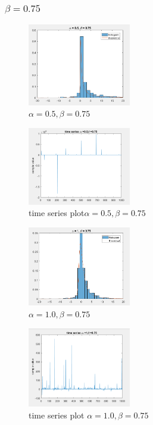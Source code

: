 \documentclass[twoside]{article}
\begin{document}
\begin{multicols*}{2}
\subsubsection{$\beta = 0.75$}
\begin{figure}[H]
   \centering
   \includegraphics[width = 0.4\textwidth]{../data/a05b75.png}  
   \caption{$\alpha = 0.5, \beta = 0.75$}
\end{figure}
\begin{figure}[H]
   \centering
   \includegraphics[width = 0.4\textwidth]{../data/a05b75time.png}  
   \caption{time series plot$\alpha = 0.5, \beta = 0.75$}
\end{figure}

\begin{figure}[H]
   \centering
   \includegraphics[width = 0.4\textwidth]{../data/a1b75.png}  
   \caption{$\alpha = 1.0, \beta = 0.75$}
\end{figure}
\begin{figure}[H]
   \centering
   \includegraphics[width = 0.4\textwidth]{../data/a1b75time.png}  
   \caption{time series plot $\alpha = 1.0, \beta = 0.75$}
\end{figure}


\end{multicols*}
\end{document}
